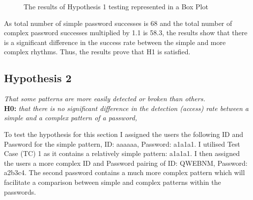 \documentclass{article}
\begin{document}
\begin{figure} [H]
    \centering
    \caption{The results of Hypothesis 1 testing represented in a Box Plot}
    \label{fig:boxPlotHyp1}
\end{figure}

As total number of simple password successes is 68 and the total number of complex password successes multiplied by 1.1 is 58.3, the results show that there is a significant difference in the success rate between the simple and more complex rhythms.  Thus, the results prove that H1 is satisfied.

\subsection{Hypothesis 2}
\begin{center}
\textit{That some patterns are more easily detected or broken than others.} \newline \\

\textbf{H0:} \textit{that	there	is no significant difference in	the	detection (access)	rate	between	a	simple	and	a	complex	pattern	of	a password,} \newline \\
\end{center}

To test the hypothesis for this section I assigned the users the following ID and Password for the simple pattern, ID: aaaaaa, Password: a1a1a1. I utilised Test Case (TC) 1 as it contains a relatively simple pattern: a1a1a1. I then assigned the users a more complex ID and Password pairing of ID: QWEBNM, Password: a2b3c4. The second password contains a much more complex pattern which will facilitate a comparison between simple and complex patterns within the passwords. 
\end{document}
